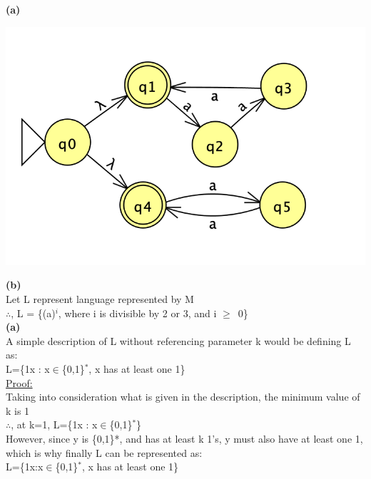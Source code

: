 \documentclass{homework}
\begin{document}
\maketitle

\question

\textbf{(a)}\\
\begin{center}
    \includegraphics{A2Q1.png}\\
\end{center}

\textbf{(b)}\\
Let L represent language represented by M\\
$\therefore$, L = \{(a)$^i$, where i is divisible by 2 or 3, and i $\geq$\ 0\}\\

\question
\textbf{(a)}\\
A simple description of L without referencing parameter k would be defining L as:\\
L=\{1x : x$\in$\{0,1\}$^*$, x has at least one 1\}\\
\newline
\underline {Proof:}\\
Taking into consideration what is given in the description, the minimum value of k is 1\\
$\therefore$, at k=1, L=\{1x : x$\in$\{0,1\}$^*$\}\\
\newline
\newline
However, since y is \{0,1\}*, and has at least k 1’s, y must also have at least one 1, which is why finally L can be represented as:\\
\newline
L=\{1x:x$\in$\{0,1\}$^*$, x has at least one 1\}\\
\end{document}
